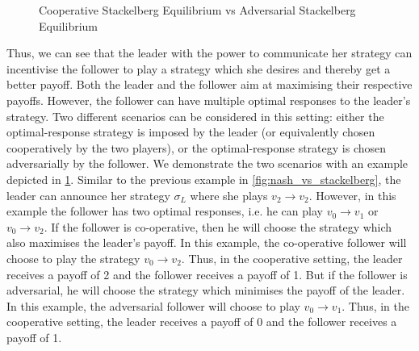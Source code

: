 \begin{figure}
    \centering
    \caption{Cooperative Stackelberg Equilibrium vs Adversarial Stackelberg Equilibrium}
    \label{fig:cooperative_vs_adversarial}
\end{figure}

Thus, we can see that the leader with the power to communicate her strategy can incentivise the follower to play a strategy which she desires and thereby get a better payoff. Both the leader and the follower aim at maximising their respective payoffs. However, the follower can have multiple optimal responses to the leader's strategy. Two different scenarios can be considered in this setting: either the optimal-response strategy is imposed by the leader (or equivalently chosen cooperatively by the two players), or the optimal-response strategy is chosen adversarially by the follower. We demonstrate the two scenarios with an example depicted in \cref{fig:cooperative_vs_adversarial}. Similar to the previous example in \cref{fig:nash_vs_stackelberg}, the leader can announce her strategy $\sigma_L$ where she plays $v_2 \to v_2$. However, in this example the follower has two optimal responses, i.e. he can play $v_0 \to v_1$ or $v_0 \to v_2$. If the follower is co-operative, then he will choose the strategy which also maximises the leader's payoff. In this example, the co-operative follower will choose to play the strategy $v_0 \to v_2$. Thus, in the cooperative setting, the leader receives a payoff of 2 and the follower receives a payoff of 1. But if the follower is adversarial, he will choose the strategy which minimises the payoff of the leader. In this example, the adversarial follower will choose to play $v_0 \to v_1$. Thus, in the cooperative setting, the leader receives a payoff of 0 and the follower receives a payoff of 1.

